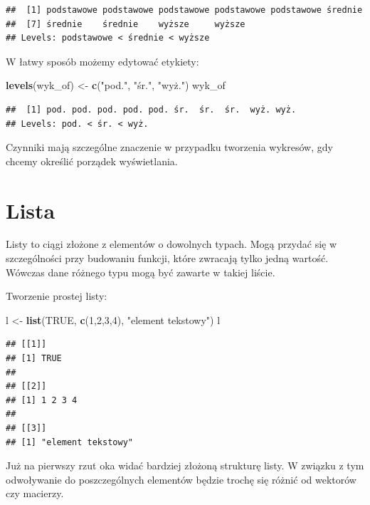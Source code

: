 \documentclass[]{book}
\newenvironment{Shaded}{\begin{snugshade}}{\end{snugshade}}
\newcommand{\KeywordTok}[1]{\textcolor[rgb]{0.13,0.29,0.53}{\textbf{#1}}}
\newcommand{\DecValTok}[1]{\textcolor[rgb]{0.00,0.00,0.81}{#1}}
\newcommand{\StringTok}[1]{\textcolor[rgb]{0.31,0.60,0.02}{#1}}
\newcommand{\OtherTok}[1]{\textcolor[rgb]{0.56,0.35,0.01}{#1}}
\newcommand{\NormalTok}[1]{#1}
\begin{document}
\begin{verbatim}
##  [1] podstawowe podstawowe podstawowe podstawowe podstawowe średnie   
##  [7] średnie    średnie    wyższe     wyższe    
## Levels: podstawowe < średnie < wyższe
\end{verbatim}

W łatwy sposób możemy edytować etykiety:

\begin{Shaded}
\begin{Highlighting}[]
\KeywordTok{levels}\NormalTok{(wyk_of) <-}\StringTok{ }\KeywordTok{c}\NormalTok{(}\StringTok{"pod."}\NormalTok{, }\StringTok{"śr."}\NormalTok{, }\StringTok{"wyż."}\NormalTok{)}
\NormalTok{wyk_of}
\end{Highlighting}
\end{Shaded}

\begin{verbatim}
##  [1] pod. pod. pod. pod. pod. śr.  śr.  śr.  wyż. wyż.
## Levels: pod. < śr. < wyż.
\end{verbatim}

Czynniki mają szczególne znaczenie w przypadku tworzenia wykresów, gdy
chcemy określić porządek wyświetlania.

\section{Lista}\label{lista}

Listy to ciągi złożone z elementów o dowolnych typach. Mogą przydać się
w szczególności przy budowaniu funkcji, które zwracają tylko jedną
wartość. Wówczas dane różnego typu mogą być zawarte w takiej liście.

Tworzenie prostej listy:

\begin{Shaded}
\begin{Highlighting}[]
\NormalTok{l <-}\StringTok{ }\KeywordTok{list}\NormalTok{(}\OtherTok{TRUE}\NormalTok{, }\KeywordTok{c}\NormalTok{(}\DecValTok{1}\NormalTok{,}\DecValTok{2}\NormalTok{,}\DecValTok{3}\NormalTok{,}\DecValTok{4}\NormalTok{), }\StringTok{"element tekstowy"}\NormalTok{)}
\NormalTok{l}
\end{Highlighting}
\end{Shaded}

\begin{verbatim}
## [[1]]
## [1] TRUE
## 
## [[2]]
## [1] 1 2 3 4
## 
## [[3]]
## [1] "element tekstowy"
\end{verbatim}

Już na pierwszy rzut oka widać bardziej złożoną strukturę listy. W
związku z tym odwoływanie do poszczególnych elementów będzie trochę się
różnić od wektorów czy macierzy.
\end{document}
